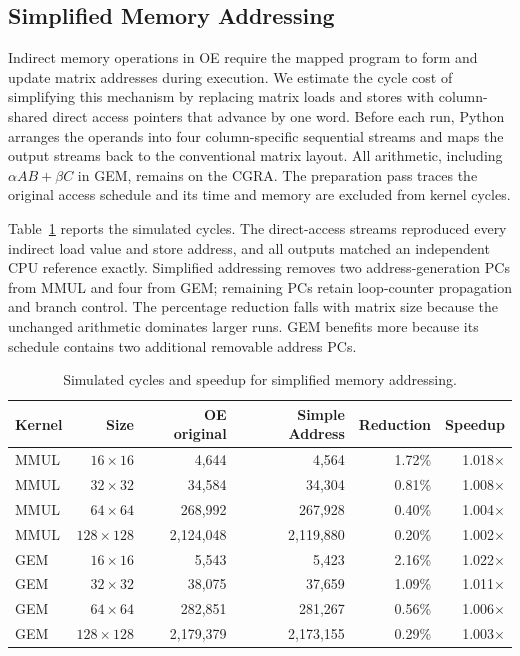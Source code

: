 \subsection{Simplified Memory Addressing}
\label{subsec:simple-address}

Indirect memory operations in OE require the mapped program to form and update
matrix addresses during execution. We estimate the cycle cost of simplifying
this mechanism by replacing matrix loads and stores with column-shared direct
access pointers that advance by one word. Before each run, Python arranges the
operands into four column-specific sequential streams and maps the output
streams back to the conventional matrix layout. All arithmetic, including
$\alpha AB+\beta C$ in GEM, remains on the CGRA. The preparation pass traces
the original access schedule and its time and memory are excluded from kernel
cycles.

Table~\ref{tab:simple-address-cycles} reports the simulated cycles. The
direct-access streams reproduced every indirect load value and store address,
and all outputs matched an independent CPU reference exactly. Simplified
addressing removes two address-generation PCs from MMUL and four from GEM;
remaining PCs retain loop-counter propagation and branch control. The
percentage reduction falls with matrix size because the unchanged arithmetic
dominates larger runs. GEM benefits more because its schedule contains two
additional removable address PCs.

\begin{table}[t]
\centering
\caption{Simulated cycles and speedup for simplified memory addressing.}
\label{tab:simple-address-cycles}
\begin{tabular}{lrrrrr}
\hline
Kernel & Size & OE original & Simple Address & Reduction & Speedup \\
\hline
MMUL & $16\times16$ & 4,644 & 4,564 & 1.72\% & 1.018$\times$ \\
MMUL & $32\times32$ & 34,584 & 34,304 & 0.81\% & 1.008$\times$ \\
MMUL & $64\times64$ & 268,992 & 267,928 & 0.40\% & 1.004$\times$ \\
MMUL & $128\times128$ & 2,124,048 & 2,119,880 & 0.20\% & 1.002$\times$ \\
GEM & $16\times16$ & 5,543 & 5,423 & 2.16\% & 1.022$\times$ \\
GEM & $32\times32$ & 38,075 & 37,659 & 1.09\% & 1.011$\times$ \\
GEM & $64\times64$ & 282,851 & 281,267 & 0.56\% & 1.006$\times$ \\
GEM & $128\times128$ & 2,179,379 & 2,173,155 & 0.29\% & 1.003$\times$ \\
\hline
\end{tabular}
\end{table}

